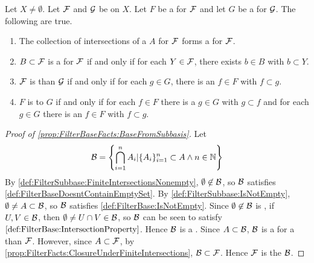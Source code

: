 \begin{prop}[FilterBaseFacts]
\label{prop:FilterBaseFacts}
   Let $X \neq \emptyset$. 
   Let $\mathcal{F}$ and $\mathcal{G}$ be \Filters on $X$. 
   Let $F$ be a \FilterBase for $\mathcal{F}$ and let 
   $G$ be a \FilterBase for $\mathcal{G}$. 
   The following are true. 
   \begin{enumerate}[label=(\roman*), ref={\ref{prop:FilterBaseFacts}.~\roman*}]
    \item \label{prop:FilterBaseFacts:BaseFromSubbasis}
        The collection of \Finite intersections of a 
        \FilterSubbasis $A$ for $\mathcal{F}$ 
        forms a \FilterBase for $\mathcal{F}$. 
    \item \label{prop:FilterBaseFacts:BaseCondition}
    $B \subset \mathcal{F}$ is a \FilterBase for $\mathcal{F}$ 
    if and only if for each $Y \in \mathcal{F}$, there exists
    $b \in B$ with $b \subset Y$. 
    \item \label{prop:FilterBaseFacts:FinerCondition}
       $\mathcal{F}$ 
       is \FinerFilter than $\mathcal{G}$ if and only if
       for each $g \in G$, there is an $f \in F$ with $f \subset g$. 
    \item  \label{prop:FilterBaseFact:EquivalenceCondition} 
    $F$ is 
    \FilterBaseEquivalent to 
    $G$ if and only if for each 
    $f \in F$ there  is a 
    $g \in G$ with $g \subset f$ 
    and for each $g \in G$ there is an 
    $f \in F$ with $f \subset g$. 
   \end{enumerate}
   \begin{proof}[Proof of \ref{prop:FilterBaseFacts:BaseFromSubbasis}]
   Let 
   \begin{equation}
    \mathcal{B} = \left\{ \bigcap\limits_{i=1}^n A_i | \{A_i\}_{i=1}^n \subset A \wedge n \in \mathbb{N}\right\}
   \end{equation}
   By \ref{def:FilterSubbase:FiniteIntersectionsNonempty}, $\emptyset \not \in \mathcal{B}$, so $\mathcal{B}$ satisfies \ref{def:FilterBaseDoesntContainEmptySet}. 
   By \ref{def:FilterSubbase:IsNotEmpty}, $\emptyset \neq A \subset \mathcal{B}$, so $\mathcal{B}$ satisfies \ref{def:FilterBase:IsNotEmpty}. 
   Since $\emptyset \not \in \mathcal{B}$ is \ClosedUnderFiniteIntersections, if $U,V \in \mathcal{B}$, then $\emptyset \neq U \cap V \in \mathcal{B}$, so $\mathcal{B}$ can be seen to satisfy $\ref{def:FilterBase:IntersectionProperty}$. Hence $\mathcal{B}$ is a \FilterBase. 
   Since $A \subset \mathcal{B}$, $\mathcal{B}$ is a \FilterBase for a \FinerFilter than $\mathcal{F}$. 
   However, since $A \subset \mathcal{F}$, 
   by \ref{prop:FilterFacts:ClosureUnderFiniteIntersections}, $\mathcal{B} \subset \mathcal{F}$. 
   Hence $\mathcal{F}$ is the \Filter
   \FilterGeneratedBy $\mathcal{B}$. 
   \end{proof}

\end{prop}
